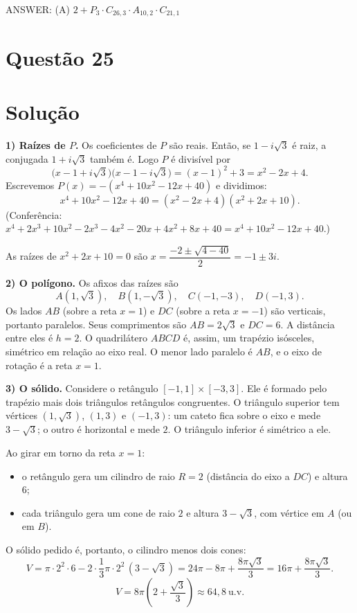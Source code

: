 \documentclass{article}%
\begin{document}
ANSWER: (A) $2 + P_3\cdot C_{26,3}\cdot A_{10,2}\cdot C_{21,1}$%
\newpage%
\section*{Questão 25}

\section*{Solução}

\textbf{1) Raízes de $P$.} Os coeficientes de $P$ são reais. Então, se $1-i\sqrt{3}$ é raiz, a conjugada $1+i\sqrt{3}$ também é. Logo $P$ é divisível por
\[
\bigl(x-1+i\sqrt{3}\bigr)\bigl(x-1-i\sqrt{3}\bigr)=(x-1)^2+3=x^2-2x+4 .
\]
Escrevemos $P(x)=-(x^4+10x^2-12x+40)$ e dividimos:
\[
x^4+10x^2-12x+40=(x^2-2x+4)(x^2+2x+10).
\]
(Conferência: $x^4+2x^3+10x^2-2x^3-4x^2-20x+4x^2+8x+40=x^4+10x^2-12x+40$.)

As raízes de $x^2+2x+10=0$ são $x=\dfrac{-2\pm\sqrt{4-40}}{2}=-1\pm 3i$.

\textbf{2) O polígono.} Os afixos das raízes são
\[
A(1,\sqrt{3}),\quad B(1,-\sqrt{3}),\quad C(-1,-3),\quad D(-1,3).
\]
Os lados $AB$ (sobre a reta $x=1$) e $DC$ (sobre a reta $x=-1$) são verticais, portanto paralelos. Seus comprimentos são $AB=2\sqrt{3}$ e $DC=6$. A distância entre eles é $h=2$. O quadrilátero $ABCD$ é, assim, um trapézio isósceles, simétrico em relação ao eixo real. O menor lado paralelo é $AB$, e o eixo de rotação é a reta $x=1$.

\textbf{3) O sólido.} Considere o retângulo $[-1,1]\times[-3,3]$. Ele é formado pelo trapézio mais dois triângulos retângulos congruentes. O triângulo superior tem vértices $(1,\sqrt{3})$, $(1,3)$ e $(-1,3)$: um cateto fica sobre o eixo e mede $3-\sqrt{3}$; o outro é horizontal e mede $2$. O triângulo inferior é simétrico a ele.

Ao girar em torno da reta $x=1$:
\begin{itemize}
\item o retângulo gera um cilindro de raio $R=2$ (distância do eixo a $DC$) e altura $6$;
\item cada triângulo gera um cone de raio $2$ e altura $3-\sqrt{3}$, com vértice em $A$ (ou em $B$).
\end{itemize}
O sólido pedido é, portanto, o cilindro menos dois cones:
\[
V=\pi\cdot 2^2\cdot 6-2\cdot\frac{1}{3}\pi\cdot 2^2\,(3-\sqrt{3})
=24\pi-8\pi+\frac{8\pi\sqrt{3}}{3}
=16\pi+\frac{8\pi\sqrt{3}}{3}.
\]
\[
\boxed{V=8\pi\left(2+\frac{\sqrt{3}}{3}\right)\approx 64{,}8\ \text{u.v.}}
\]
\end{document}
